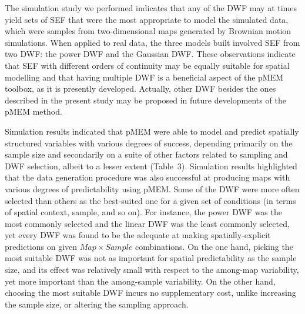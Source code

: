 \documentclass[
]{article}
\begin{document}
The simulation study we performed indicates that any of the DWF may at
times yield sets of SEF that were the most appropriate to model the
simulated data, which were samples from two-dimensional maps generated
by Brownian motion simulations. When applied to real data, the three
models built involved SEF from two DWF: the power DWF and the Gaussian
DWF. These observations indicate that SEF with different orders of
continuity may be equally suitable for spatial modelling and that having
multiple DWF is a beneficial aspect of the pMEM toolbox, as it is
presently developed. Actually, other DWF besides the ones described in
the present study may be proposed in future developments of the pMEM
method.

Simulation results indicated that pMEM were able to model and predict
spatially structured variables with various degrees of success,
depending primarily on the sample size and secondarily on a suite of
other factors related to sampling and DWF selection, albeit to a lesser
extent (Table~3). Simulation results highlighted that the data
generation procedure was also successful at producing maps with various
degrees of predictability using pMEM. Some of the DWF were more often
selected than others as the best-suited one for a given set of
conditions (in terms of spatial context, sample, and so on). For
instance, the power DWF was the most commonly selected and the linear
DWF was the least commonly selected, yet every DWF was found to be the
adequate at making spatially-explicit predictions on given
\(Map \times Sample\) combinations. On the one hand, picking the most
suitable DWF was not as important for spatial predictability as the
sample size, and its effect was relatively small with respect to the
among-map variability, yet more important than the among-sample
variability. On the other hand, choosing the most suitable DWF incurs no
supplementary cost, unlike increasing the sample size, or altering the
sampling approach.
\end{document}
